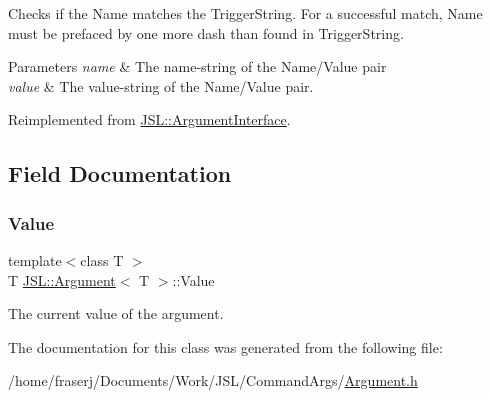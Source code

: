 Checks if the Name matches the Trigger\+String. For a successful match, Name must be prefaced by one more dash than found in Trigger\+String. 


\begin{DoxyParams}{Parameters}
{\em name} & The name-\/string of the Name/\+Value pair\\
\hline
{\em value} & The value-\/string of the Name/\+Value pair. \\
\hline
\end{DoxyParams}


Reimplemented from \hyperlink{classJSL_1_1ArgumentInterface_a28b487f7a4fa6e721ed6629abe2073f2}{J\+S\+L\+::\+Argument\+Interface}.



\subsection{Field Documentation}
\mbox{\label{classJSL_1_1Argument_a83ada5bfa412192f76dd4290f679defd}} 
\subsubsection{\texorpdfstring{Value}{Value}}
{\footnotesize\ttfamily template$<$class T $>$ \\
T \hyperlink{classJSL_1_1Argument}{J\+S\+L\+::\+Argument}$<$ T $>$\+::Value}



The current value of the argument. 



The documentation for this class was generated from the following file\+:\begin{DoxyCompactItemize}
\item 
/home/fraserj/\+Documents/\+Work/\+J\+S\+L/\+Command\+Args/\hyperlink{Argument_8h}{Argument.\+h}\end{DoxyCompactItemize}
